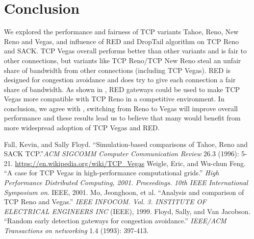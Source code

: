 \documentclass[10pt, conference]{IEEEtran/IEEEtran}
\begin{document}
\section{Conclusion}
We explored the performance and fairness of TCP variants Tahoe, Reno, New Reno and Vegas, and influence of RED and DropTail algorithm on TCP Reno and SACK. TCP Vegas overall performs better than other variants and is fair to other connections, but variants like TCP Reno/TCP New Reno steal an unfair share of bandwidth from other connections (including TCP Vegas). RED is designed for congestion avoidance and does try to give each connection a fair share of bandwidth. As shown in \cite{reno}, RED gateways could be used to make TCP Vegas more compatible with TCP Reno in a competitive environment. In conclusion, we agree with \cite{vegas_red}, switching from Reno to Vegas will improve overall performance and these results lead us to believe that many would benefit from more widespread adoption of TCP Vegas and RED.

\begin{thebibliography}{50}
 Fall, Kevin, and Sally Floyd. ``Simulation-based comparisons of Tahoe, Reno and SACK TCP.''\textit{ACM SIGCOMM Computer Communication Review}
 26.3 (1996): 5-21.
   \url{https://en.wikipedia.org/wiki/TCP_Vegas}
  Weigle, Eric, and Wu-chun Feng. ``A case for TCP Vegas in high-performance computational grids.'' 
 \textit{High Performance Distributed Computing, 2001. Proceedings. 10th IEEE International Symposium on}. IEEE, 2001. 
  Mo, Jeonghoon, et al. ``Analysis and comparison of TCP Reno and Vegas.'' 
 \textit{IEEE INFOCOM. Vol. 3. INSTITUTE OF ELECTRICAL ENGINEERS INC} (IEEE), 1999.
  Floyd, Sally, and Van Jacobson. ``Random early detection gateways for congestion avoidance.'' \textit{IEEE/ACM Transactions on networking} 1.4 (1993): 397-413.
\end{thebibliography}
\end{document}
